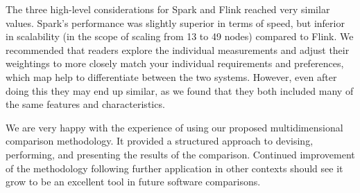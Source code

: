   The three high-level considerations for Spark and Flink reached very similar values. Spark's performance was slightly superior in terms of speed, but inferior in scalability (in the scope of scaling from 13 to 49 nodes) compared to Flink. We recommended that readers explore the individual measurements and adjust their weightings to more closely match your individual requirements and preferences, which map help to differentiate between the two systems. However, even after doing this they may end up similar, as we found that they both included many of the same features and characteristics.

  We are very happy with the experience of using our proposed multidimensional comparison methodology. It provided a structured approach to devising, performing, and presenting the results of the comparison. Continued improvement of the methodology following further application in other contexts should see it grow to be an excellent tool in future software comparisons.